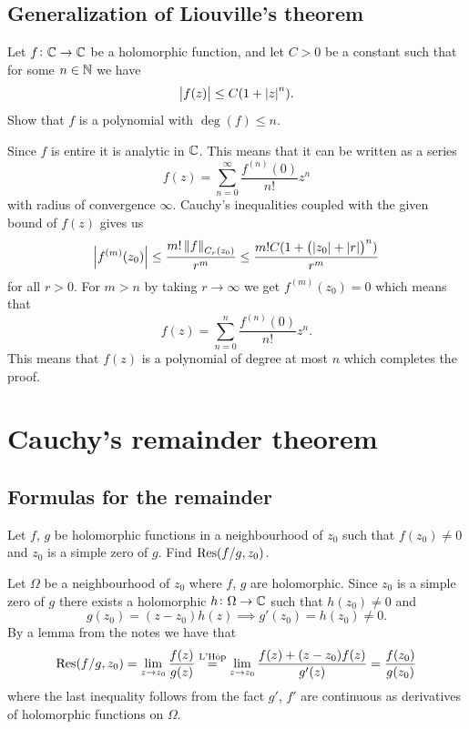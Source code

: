 \documentclass[11pt,a4paper]{article}
\begin{document}
\subsection{Generalization of Liouville's theorem}
\begin{exercise}
  Let $f \colon \mathbb{C} \to \mathbb{C}$ be a holomorphic function, and let
  $C > 0$ be a constant such that for some $n \in \mathbb{N}$ we have
  \[
    \left\lvert f(z)\right\rvert \le C(1 + \left\lvert z\right\rvert^n).
  \]
  Show that $f$ is a polynomial with $\deg(f) \le n$.
\end{exercise}
\begin{solution}
  Since $f$ is entire it is analytic in $\mathbb{C}$.
  This means that it can be written as a series
  \[
    f(z) = \sum_{n=0}^{\infty} \frac{f^{(n)}(0)}{n!} z^n
  \]
  with radius of convergence $\infty$.
  Cauchy's inequalities coupled with the given bound of $f(z)$ gives us
  \[
    \abs{f^{(m)}(z_0)} \le
    \frac{m! \norm{f}_{C_r(z_0)}}{r^m} \le
    \frac{m! C(1 + \del{\abs{z_0} + \abs{r}}^n)}{r^m}
  \]
  for all $r > 0$.
  For $m > n$ by taking $r \to \infty$ we get $f^{(m)}(z_0) = 0$ which
  means that
  \[
    f(z) = \sum_{n=0}^{n} \frac{f^{(n)}(0)}{n!} z^n.
  \]
  This means that $f(z)$ is a polynomial of degree at most $n$ which
  completes the proof.
\end{solution}

\newpage
\section{Cauchy's remainder theorem}

\subsection{Formulas for the remainder}
\begin{exercise}
  \label{ex:remainder-of-f/g}
  Let $f$, $g$ be holomorphic functions in a neighbourhood of $z_0$ such that
  $f(z_0) \neq 0$
  and $z_0$ is a simple zero of $g$.
  Find $\operatorname{Res}(f / g, z_0)$.
\end{exercise}
\begin{solution}
  Let $\Omega$ be a neighbourhood of $z_0$ where $f$, $g$ are holomorphic.
  Since $z_0$ is a simple zero of $g$ there exists a holomorphic
  $h \colon \Omega \to \mathbb{C}$ such that $h(z_0) \neq 0$ and
  \[
    g(z_0) = (z - z_0) h(z) \implies
    g'(z_0) = h(z_0) \neq 0.
  \]
  By a lemma from the notes we have that
  \[
    \operatorname{Res}(f / g, z_0) =
    \lim_{z \to z_0} \frac{f(z)}{g(z)} \overset{\text{L'H\^op}}{=}
    \lim_{z \to z_0} \frac{f(z) + (z - z_0) f(z)}{g'(z)} =
    \frac{f(z_0)}{g(z_0)}
  \]
  where the last inequality follows from the fact $g'$, $f'$ are continuous
  as derivatives of holomorphic functions on $\Omega$.
\end{solution}
\end{document}
